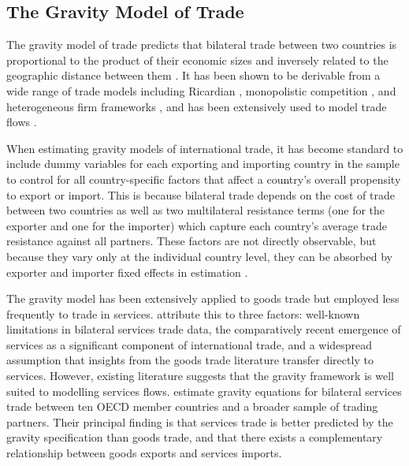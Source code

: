 \subsection{The Gravity Model of Trade}
\label{sec:gravity}

The gravity model of trade predicts that bilateral trade between two countries is proportional to the product of their economic sizes and inversely related to the geographic distance between them \citep{tinbergen1962}. It has been shown to be derivable from a wide range of trade models including Ricardian \citep{eaton2002}, monopolistic competition \citep{krugman1980}, and heterogeneous firm frameworks \citep{chaney2008}, and has been extensively used to model trade flows \citep{head2014}.

When estimating gravity models of international trade, it has become standard to include dummy variables for each exporting and importing country in the sample to control for all country-specific factors that affect a country's overall propensity to export or import. This is because bilateral trade depends on the cost of trade between two countries as well as two multilateral resistance terms (one for the exporter and one for the importer) which capture each country's average trade resistance against all partners. These factors are not directly observable, but because they vary only at the individual country level, they can be absorbed by exporter and importer fixed effects in estimation \citep{anderson2003}.

The gravity model has been extensively applied to goods trade but employed less frequently to trade in services. \citet{santanna2023} attribute this to three factors: well-known limitations in bilateral services trade data, the comparatively recent emergence of services as a significant component of international trade, and a widespread assumption that insights from the goods trade literature transfer directly to services. However, existing literature suggests that the gravity framework is well suited to modelling services flows. \citet{kimura2006} estimate gravity equations for bilateral services trade between ten OECD member countries and a broader sample of trading partners. Their principal finding is that services trade is better predicted by the gravity specification than goods trade, and that there exists a complementary relationship between goods exports and services imports.


